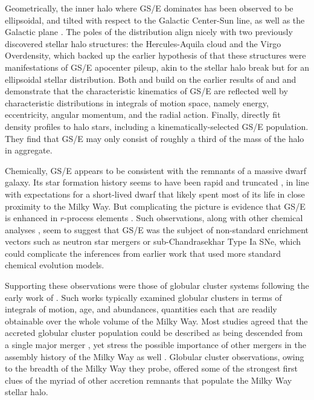 Geometrically, the inner halo where GS/E dominates has been observed to be ellipsoidal, and tilted with respect to the Galactic Center-Sun line, as well as the Galactic plane \parencite{iorio19}. The poles of the distribution align nicely with two previously discovered stellar halo structures: the Hercules-Aquila cloud and the Virgo Overdensity, which backed up the earlier hypothesis of \textcite{simion19} that these structures were manifestations of GS/E apocenter pileup, akin to the stellar halo break but for an ellipsoidal stellar distribution. Both \textcite{koppelman18} and \textcite{feuillet20} build on the earlier results of \textcite{helmi18} and \textcite{myeong18} and demonstrate that the characteristic kinematics of GS/E are reflected well by characteristic distributions in integrals of motion space, namely energy, eccentricity, angular momentum, and the radial action. Finally, \textcite{mackereth20} directly fit density profiles to halo stars, including a kinematically-selected GS/E population. They find that GS/E may only consist of roughly a third of the mass of the halo in aggregate.

Chemically, GS/E appears to be consistent with the remnants of a massive dwarf galaxy. Its star formation history seems to have been rapid and truncated \parencite{fernandezalvar18,vincenzo19,monty20,hasselquist21}, in line with expectations for a short-lived dwarf that likely spent most of its life in close proximity to the Milky Way. But complicating the picture is evidence that GS/E is enhanced in $r$-process elements \parencite[][]{aguado21,matsuno21}. Such observations, along with other chemical analyses \parencite{sanders21}, seem to suggest that GS/E was the subject of non-standard enrichment vectors such as neutron star mergers or sub-Chandrasekhar Type Ia SNe, which could complicate the inferences from earlier work that used more standard chemical evolution models. 

Supporting these observations were those of globular cluster systems following the early work of \textcite{myeong18}. Such works typically examined globular clusters in terms of integrals of motion, age, and abundances, quantities each that are readily obtainable over the whole volume of the Milky Way. Most studies agreed that the accreted globular cluster population could be described as being descended from a single major merger \parencite{massari19}, yet stress the possible importance of other mergers in the assembly history of the Milky Way as well \parencite{myeong19,kruijssen19,forbes20}. Globular cluster observations, owing to the breadth of the Milky Way they probe, offered some of the strongest first clues of the myriad of other accretion remnants that populate the Milky Way stellar halo.

